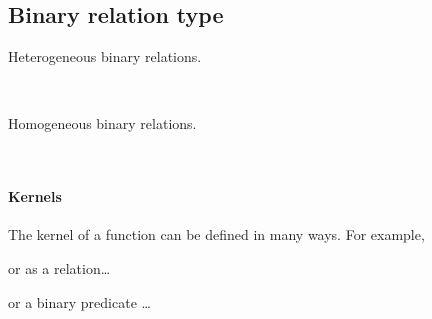 \documentclass[a4paper,UKenglish,cleveref, autoref, thm-restate]{lipics-v2019}
\begin{document}
\subsection{Binary relation type}\label{binary-relation-type}
Heterogeneous binary relations.
\begin{code}%
\>[0]\AgdaSpace{}%
\AgdaSymbol{:}\AgdaSpace{}%
\AgdaSpace{}%
\AgdaSpace{}%
\AgdaSpace{}%
\AgdaSpace{}%
\AgdaSpace{}%
\AgdaSpace{}%
\AgdaSymbol{(}\AgdaSpace{}%
\AgdaSymbol{:}\AgdaSpace{}%
\AgdaSymbol{)}\AgdaSpace{}%
\AgdaSpace{}%
\AgdaSymbol{(}\AgdaSpace{}%
\AgdaSpace{}%
\AgdaSpace{}%
\AgdaSpace{}%
\AgdaSpace{}%
\AgdaSymbol{)}\AgdaSpace{}%
\<%
\\
\>[0]\AgdaSpace{}%
\AgdaSpace{}%
\AgdaSpace{}%
\AgdaSpace{}%
\AgdaSymbol{=}\AgdaSpace{}%
\AgdaSpace{}%
\AgdaSpace{}%
\AgdaSpace{}%
\AgdaSpace{}%
\AgdaSpace{}%
\<%
\end{code}

Homogeneous binary relations.
\begin{code}%
\>[0]\AgdaSpace{}%
\AgdaSymbol{:}\AgdaSpace{}%
\AgdaSpace{}%
\AgdaSpace{}%
\AgdaSpace{}%
\AgdaSymbol{(}\AgdaSpace{}%
\AgdaSymbol{:}\AgdaSpace{}%
\AgdaSymbol{)}\AgdaSpace{}%
\AgdaSpace{}%
\AgdaSpace{}%
\AgdaSpace{}%
\AgdaSpace{}%
\AgdaSpace{}%
\<%
\\
\>[0]\AgdaSpace{}%
\AgdaSpace{}%
\AgdaSpace{}%
\AgdaSymbol{=}\AgdaSpace{}%
\AgdaSpace{}%
\AgdaSpace{}%
\AgdaSpace{}%
\<%
\end{code}

\paragraph*{Kernels}\label{kernels}
The kernel of a function can be defined in many ways. For example,
\begin{code}  \end{code}
or as a relation\ldots{}
\begin{code}  \end{code}
or a binary predicate …
\begin{code}\end{code}
\end{document}
